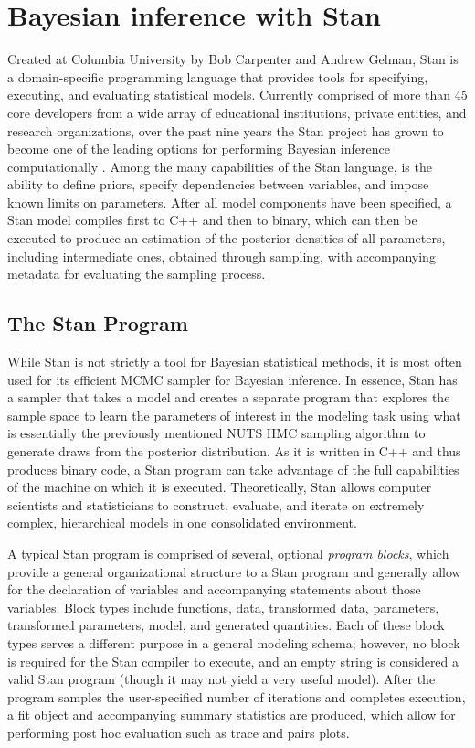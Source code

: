 \documentclass[
  12pt,
  oneside]{book}
\theoremstyle{definition}
\theoremstyle{definition}
\theoremstyle{definition}
\theoremstyle{remark}
\begin{document}
\hypertarget{bayesian-inference-with-stan}{%
\chapter{Bayesian inference with Stan}\label{bayesian-inference-with-stan}}

Created at Columbia University by Bob Carpenter and Andrew Gelman, Stan is a domain-specific programming language that provides tools for specifying, executing, and evaluating statistical models.
Currently comprised of more than 45 core developers from a wide array of educational institutions, private entities, and research organizations, over the past nine years the Stan project has grown to become one of the leading options for performing Bayesian inference computationally \citep{Stan2021}.
Among the many capabilities of the Stan language, is the ability to define priors, specify dependencies between variables, and impose known limits on parameters.
After all model components have been specified, a Stan model compiles first to C++ and then to binary, which can then be executed to produce an estimation of the posterior densities of all parameters, including intermediate ones, obtained through sampling, with accompanying metadata for evaluating the sampling process.

\hypertarget{the-stan-program}{%
\section{The Stan Program}\label{the-stan-program}}

While Stan is not strictly a tool for Bayesian statistical methods, it is most often used for its efficient MCMC sampler for Bayesian inference.
In essence, Stan has a sampler that takes a model and creates a separate program that explores the sample space to learn the parameters of interest in the modeling task using what is essentially the previously mentioned NUTS HMC sampling algorithm to generate draws from the posterior distribution.
As it is written in C++ and thus produces binary code, a Stan program can take advantage of the full capabilities of the machine on which it is executed.
Theoretically, Stan allows computer scientists and statisticians to construct, evaluate, and iterate on extremely complex, hierarchical models in one consolidated environment.

A typical Stan program is comprised of several, optional \emph{program blocks}, which provide a general organizational structure to a Stan program and generally allow for the declaration of variables and accompanying statements about those variables.
Block types include functions, data, transformed data, parameters, transformed parameters, model, and generated quantities.
Each of these block types serves a different purpose in a general modeling schema; however, no block is required for the Stan compiler to execute, and an empty string is considered a valid Stan program (though it may not yield a very useful model).
After the program samples the user-specified number of iterations and completes execution, a fit object and accompanying summary statistics are produced, which allow for performing post hoc evaluation such as trace and pairs plots.
\end{document}
